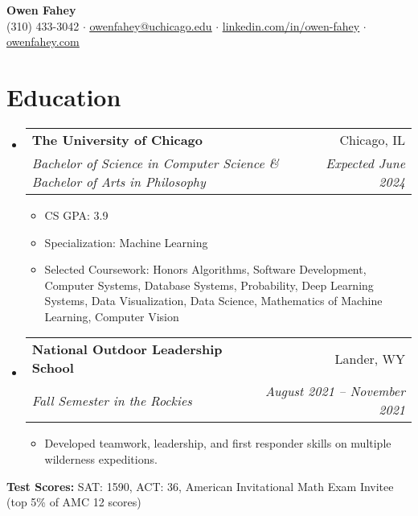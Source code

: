 \documentclass[letterpaper,11pt]{article}
\makeatletter
\newcommand{\resumeItem}[1]{
  \item\small{
    {#1 \vspace{-2pt}}
  }
}
\newcommand{\resumeSubheading}[4]{
  \vspace{-2pt}\item
    \begin{tabular*}{0.97\textwidth}[t]{l@{\extracolsep{\fill}}r}
      \textbf{#1} & #2 \\
      \textit{\small#3} & \textit{\small #4} \\
    \end{tabular*}\vspace{-7pt}
}
\newcommand{\resumeSubHeadingListStart}{\begin{itemize}[leftmargin=0.125in, label={}]}
\newcommand{\resumeSubHeadingListEnd}{\end{itemize}}
\newcommand{\resumeItemListStart}{\begin{itemize}[leftmargin=0.185in]
}
\newcommand{\resumeItemListEnd}{\end{itemize}\vspace{-5pt}}
\makeatother
\begin{document}
\begin{center}

  \textbf{\Huge 
Owen Fahey} \\
  \small (310) 433-3042 $\cdot$
  \href{mailto:owenfahey@uchicago.edu}{\underline{owenfahey@uchicago.edu}} $\cdot$
  \href{https://www.linkedin.com/in/owen-fahey}{\underline{linkedin.com/in/owen-fahey}} $\cdot$
  \href{https://owenfahey.com}{\underline{owenfahey.com}}
\end{center}

\section{Education}
  \resumeSubHeadingListStart
    \resumeSubheading
      {The University of Chicago}{Chicago, IL}
      {Bachelor of Science in Computer Science \& Bachelor of Arts in Philosophy}{Expected June 2024}
      \resumeItemListStart
        \resumeItem{CS GPA: 3.9}
        \resumeItem {Specialization: Machine Learning}
        \resumeItem{{Selected Coursework:} 
        Honors Algorithms,
        Software Development,
        Computer Systems,
        Database Systems,
        Probability,
        Deep Learning Systems,
        Data Visualization,
        Data Science,
        Mathematics of Machine Learning,
        Computer Vision
        
        }
      \resumeItemListEnd

    \resumeSubheading
      {National Outdoor Leadership School}{Lander, WY}
      {Fall Semester in the Rockies}{August 2021 -- November 2021}
      \resumeItemListStart
        \resumeItem{Developed teamwork, leadership, and first responder skills on multiple wilderness expeditions.}
      \resumeItemListEnd
  \resumeSubHeadingListEnd
  {
    \vspace{-4pt}
    \noindent\hspace{0.15in}\small\textbf{Test Scores:} SAT: 1590, ACT: 36, American Invitational Math Exam Invitee (top 5\% of AMC 12 scores)
    \vspace{-5pt}
    }
\end{document}
